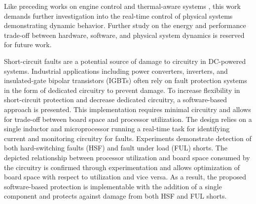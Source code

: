 \documentclass[11pt,compsoc,oneside]{report}
\begin{document}
Like preceding works on engine control \cite{engineCtrl} and thermal-aware systems \cite{thermalAware}, this work demands further investigation into the real-time control of physical systems demonstrating dynamic behavior. Further study on the energy and performance trade-off between hardware, software, and physical system dynamics is reserved for future work.

\linespread{1.0}



Short-circuit faults are a potential source of damage to circuitry in DC-powered systems. Industrial applications including power converters, inverters, and insulated-gate bipolar transistors (IGBTs) often rely on fault protection systems in the form of dedicated circuitry to prevent damage. To increase flexibility in short-circuit protection and decrease dedicated circuitry, a software-based approach is presented. This implementation requires minimal circuitry and allows for trade-off between board space and processor utilization. The design relies on a single inductor and microprocessor running a real-time task for identifying current and monitoring circuitry for faults. Experiments demonstrate detection of both hard-switching faults (HSF) and fault under load (FUL) shorts. The depicted relationship between processor utilization and board space consumed by the circuitry is confirmed through experimentation and allows optimization of board space with respect to utilization and vice versa. As a result, the proposed software-based protection is implementable with the addition of a single component and protects against damage from both HSF and FUL shorts.
\end{document}
